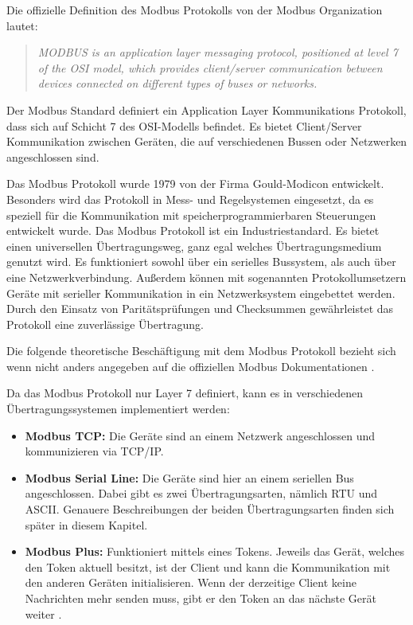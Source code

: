 \label{modbus_kapitel}
Die offizielle Definition des Modbus Protokolls von der Modbus Organization \cite{Modbus_Organization_AP:2012} lautet:
\begin{quotation}
	\emph{
		MODBUS is an application layer messaging protocol, positioned at level 7 of the OSI model, which provides client/server communication between devices connected on different types of buses or networks.}
\end{quotation}

Der Modbus Standard definiert ein Application Layer Kommunikations Protokoll, dass sich auf Schicht 7 des OSI-Modells befindet. Es bietet Client/Server Kommunikation zwischen Geräten, die auf verschiedenen Bussen oder Netzwerken angeschlossen sind.

Das Modbus Protokoll wurde 1979 von der Firma Gould-Modicon entwickelt. Besonders wird das Protokoll in Mess- und Regelsystemen eingesetzt, da es speziell für die Kommunikation mit speicherprogrammierbaren Steuerungen entwickelt wurde. Das Modbus Protokoll ist ein Industriestandard. Es bietet einen universellen Übertragungsweg, ganz egal welches Übertragungsmedium genutzt wird. Es funktioniert sowohl über ein serielles Bussystem, als auch über eine Netzwerkverbindung. Außerdem können mit sogenannten Protokollumsetzern Geräte mit serieller Kommunikation in ein Netzwerksystem eingebettet werden. Durch den Einsatz von Paritätsprüfungen und Checksummen gewährleistet das Protokoll eine zuverlässige Übertragung. \cite{KUNBUS_GmbH:o.J., kvm-concepts_GmbH:2022}


Die folgende theoretische Beschäftigung mit dem Modbus Protokoll bezieht sich wenn nicht anders angegeben auf die offiziellen Modbus Dokumentationen \cite{Modbus_Organization_AP:2012, Modbus_Organization_SL:2012}. 

Da das Modbus Protokoll nur Layer 7 definiert, kann es in verschiedenen Übertragungssystemen implementiert werden:
\begin{itemize}
	\item \textbf{Modbus TCP:} Die Geräte sind an einem Netzwerk angeschlossen und kommunizieren via TCP/IP.
	\item \textbf{Modbus Serial Line:} Die Geräte sind hier an einem seriellen Bus angeschlossen. Dabei gibt es zwei Übertragungsarten, nämlich RTU und ASCII. Genauere Beschreibungen der beiden Übertragungsarten finden sich später in diesem Kapitel.
	\item \textbf{Modbus Plus:} Funktioniert mittels eines Tokens. Jeweils das Gerät, welches den Token aktuell besitzt, ist der Client und kann die Kommunikation mit den anderen Geräten initialisieren. Wenn der derzeitige Client keine Nachrichten mehr senden muss, gibt er den Token an das nächste Gerät weiter \cite{Rinaldi:2016}.
\end{itemize}

